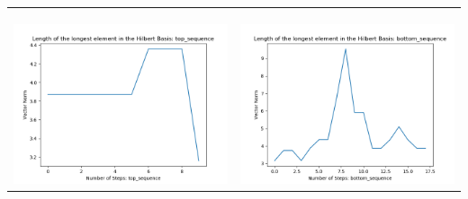 \documentclass[10pt]{article}
\begin{document}
\begin{tabular}{c|c}
\begin{minipage}{.45\textwidth}
\end{minipage} \\ \\
\hline \\\begin{minipage}{.45\textwidth}
\includegraphics[width=\textwidth]{"DATA/4d/5 generators 2 bound C/top_sequence LENGTH"}
\end{minipage} &
\begin{minipage}{.45\textwidth}
\includegraphics[width=\textwidth]{"DATA/4d/5 generators 2 bound C bottomup/bottom_sequence LENGTH"}
\end{minipage}
\end{tabular}
\end{document}
